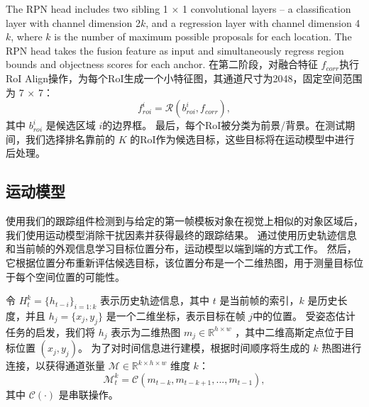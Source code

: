 The RPN head includes two sibling 1 $\times$ 1 convolutional layers -- a classification layer with channel dimension 2$k$, and a regression layer with channel dimension 4$k$, where $k$ is the number of maximum possible proposals for each location. The RPN head takes the fusion feature as input and simultaneously regress region bounds and objectness scores for each anchor.
\fi
在第二阶段，对融合特征 $f_{corr}$执行RoI Align操作，为每个RoI生成一个小特征图，其通道尺寸为2048，固定空间范围为 7 $\times$ 7：
\begin{equation}
    f_{roi}^{i} = \mathcal{R}(b_{roi}^{i}, f_{corr}),
\end{equation}
其中 $b_{roi}^{i}$ 是候选区域 $i$的边界框。
最后，每个RoI被分类为前景/背景。在测试期间，我们选择排名靠前的 $K$ 的RoI作为候选目标，这些目标将在运动模型中进行后处理。

\subsection{运动模型} 使用我们的跟踪组件检测到与给定的第一帧模板对象在视觉上相似的对象区域后，我们使用运动模型消除干扰因素并获得最终的跟踪结果。
通过使用历史轨迹信息和当前帧的外观信息学习目标位置分布，运动模型以端到端的方式工作。
然后，它根据位置分布重新评估候选目标，该位置分布是一个二维热图，用于测量目标位于每个空间位置的可能性。

令 $H_{t}^{k} = \{h_{t-i}\}_{i=1:k}$ 表示历史轨迹信息，其中 $t$ 是当前帧的索引，$k$ 是历史长度，并且 $h_{j} = \{x_{j}, y_{j}\}$ 是一个二维坐标，表示目标在帧 $j$中的位置。
受姿态估计任务的启发，我们将 $h_{j}$ 表示为二维热图 $m_{j} \in \mathbb R^{h \times w}$ ，其中二维高斯定点位于目标位置 $(x_{j}, y_{j})$。
为了对时间信息进行建模，根据时间顺序将生成的 $k$ 热图进行连接，以获得通道张量 $\mathcal{M} \in \mathbb{R}^{k \times h \times w}$ 维度 $k$：
\begin{equation}
    \mathcal{M}_{t}^{k} = \mathcal{C}(m_{t-k}, m_{t-k+1}, ..., m_{t-1}),
\end{equation}
其中 $\mathcal{C}(\cdot)$ 是串联操作。

